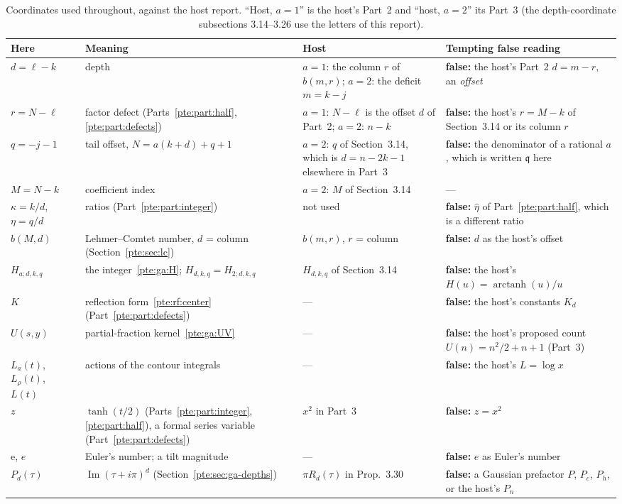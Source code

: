 \documentclass[11pt,a4paper]{article}
\numberwithin{equation}{section}
\theoremstyle{definition}
\theoremstyle{plain}
\newcommand{\ee}{\mathrm e}
\newcommand{\fq}{\mathfrak q}
\begin{document}
\begin{table}[ht]
\centering\small
\caption{Coordinates used throughout, against the host report.  ``Host, $a=1$'' is the host's Part~2 and ``host, $a=2$'' its Part~3 (the depth-coordinate subsections 3.14--3.26 use the letters of this report).}\label{pte:tab:conventions}
\begin{tabular}{@{}>{\raggedright\arraybackslash}p{}>{\raggedright\arraybackslash}p{}>{\raggedright\arraybackslash}p{}>{\raggedright\arraybackslash}p{}@{}}
\toprule
Here & Meaning & Host & Tempting false reading\\
\midrule
$d=\ell-k$ & depth & $a=1$: the column $r$ of $b(m,r)$; $a=2$: the deficit $m=k-j$ & \textbf{false:} the host's Part~2 $d=m-r$, an \emph{offset}\\
$r=N-\ell$ & factor defect (Parts~\ref{pte:part:half}, \ref{pte:part:defects}) & $a=1$: $N-\ell$ is the offset $d$ of Part~2; $a=2$: $n-k$ & \textbf{false:} the host's $r=M-k$ of Section~3.14 or its column $r$\\
$q=-j-1$ & tail offset, $N=a(k+d)+q+1$ & $a=2$: $q$ of Section~3.14, which is $d=n-2k-1$ elsewhere in Part~3 & \textbf{false:} the denominator of a rational $a$, which is written $\fq$ here\\
$M=N-k$ & coefficient index & $a=2$: $M$ of Section~3.14 & ---\\
$\kappa=k/d$, $\eta=q/d$ & ratios (Part~\ref{pte:part:integer}) & not used & \textbf{false:} $\hat\eta$ of Part~\ref{pte:part:half}, which is a different ratio\\
$b(M,d)$ & Lehmer--Comtet number, $d$ = column (Section~\ref{pte:sec:lc}) & $b(m,r)$, $r$ = column & \textbf{false:} $d$ as the host's offset\\
$H_{a;d,k,q}$ & the integer~\eqref{pte:ga:H}; $H_{d,k,q}=H_{2;d,k,q}$ & $H_{d,k,q}$ of Section~3.14 & \textbf{false:} the host's $H(u)=\operatorname{arctanh}(u)/u$\\
$K$ & reflection form~\eqref{pte:rf:center} (Part~\ref{pte:part:defects}) & --- & \textbf{false:} the host's constants $K_d$\\
$U(s,y)$ & partial-fraction kernel~\eqref{pte:ga:UV} & --- & \textbf{false:} the host's proposed count $U(n)=n^2/2+n+1$ (Part~3)\\
$L_a(t)$, $L_\rho(t)$, $L(t)$ & actions of the contour integrals & --- & \textbf{false:} the host's $L=\log x$\\
$z$ & $\tanh(t/2)$ (Parts~\ref{pte:part:integer}, \ref{pte:part:half}), a formal series variable (Part~\ref{pte:part:defects}) & $x^2$ in Part~3 & \textbf{false:} $z=x^2$\\
$\ee$, $e$ & Euler's number; a tilt magnitude & --- & \textbf{false:} $e$ as Euler's number\\
$P_d(\tau)$ & $\operatorname{Im}(\tau+i\pi)^d$ (Section~\ref{pte:sec:ga-depths}) & $\pi R_d(\tau)$ in Prop.~3.30 & \textbf{false:} a Gaussian prefactor $P$, $P_c$, $P_h$, or the host's $P_n$\\
\bottomrule
\end{tabular}
\end{table}
\end{document}
